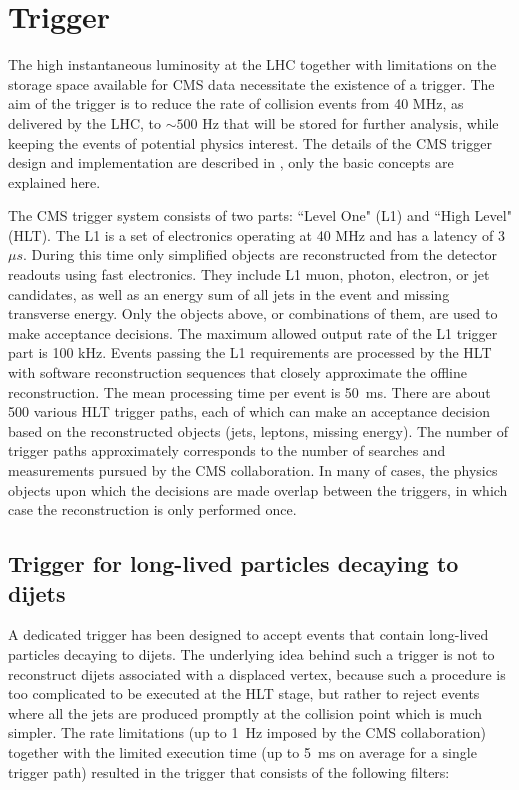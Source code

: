 \section{Trigger}

The high instantaneous luminosity at the LHC together with limitations on the storage space available for
CMS data necessitate the existence of a trigger.
 The aim of the trigger is to reduce the rate
of collision events from 40 MHz, as delivered by the LHC, to $\sim500$ Hz that will be stored
for further analysis, while keeping the events of potential physics interest.
The details of the CMS trigger design and implementation are described in \cite{Cittolin:578006},
only the basic concepts are explained here. 

The CMS trigger system consists of two parts: ``Level One" (L1) and ``High Level" (HLT).
The L1 is a set of electronics operating at 40 MHz and has a latency of 3~$\mu s$. During this
time only simplified 
objects are reconstructed from the detector readouts using fast electronics.
 They include L1 muon, photon, 
electron, or jet candidates, as well as an energy sum of all jets in the event 
and missing transverse energy.
Only the objects above, or combinations of them, are used to make acceptance decisions. 
The maximum allowed output
rate of the L1 trigger part is 100 kHz. Events passing the L1 requirements are processed by the
HLT with 
software reconstruction sequences that closely approximate
the offline reconstruction. The mean processing time per event is 50~ms. 
There are about 
500 various HLT trigger paths, each of which can make an acceptance decision based 
on the reconstructed objects
(jets, leptons, missing energy). The number of trigger paths approximately corresponds to the
number of searches and measurements pursued by the CMS collaboration.
In many of cases, the physics objects
upon which the decisions are made overlap between the triggers, in which case the reconstruction 
is only performed once.


\subsection{Trigger for long-lived particles decaying to dijets}
\label{subsec:trigger}

A dedicated trigger has been designed to accept events that contain long-lived particles 
decaying to dijets. 
The underlying idea behind such a trigger is not to reconstruct dijets
associated with a displaced vertex, because such a procedure is too complicated to be executed 
at the HLT stage, but rather to reject events where all the jets are produced promptly at the collision
point which is much simpler. The rate limitations (up to 1~Hz imposed by the CMS collaboration)
 together with the limited execution time (up to 5~ms on average for a single trigger path)
resulted in the trigger that consists of the following filters:

